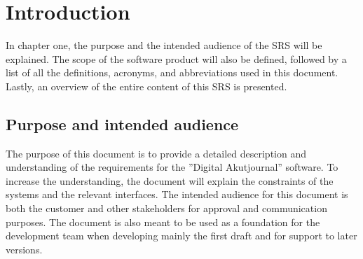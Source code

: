 \section{Introduction}
\label{sec:introduction}
In chapter one, the purpose and the intended audience of the SRS will be explained. The scope of the software product will also be defined, followed by a list of all the definitions, acronyms, and abbreviations used in this document. Lastly, an overview of the entire content of this SRS is presented.  

\subsection{Purpose and intended audience}
The purpose of this document is to provide a detailed description and understanding of the requirements for the ''Digital Akutjournal'' software. To increase the understanding, the document will explain the constraints of the systems and the relevant interfaces. The intended audience for this document is both the customer and other stakeholders for approval and communication purposes. The document is also meant to be used as a foundation for the development team when developing mainly the first draft and for support to later versions.
